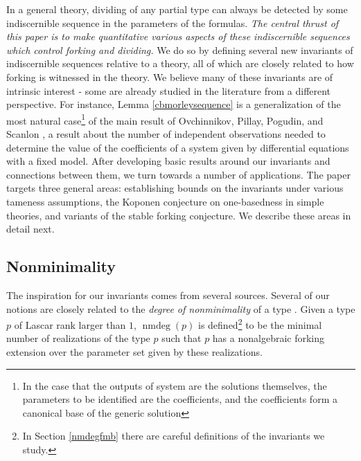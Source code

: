 \documentclass[11pt]{amsart}
\def\nmdeg{\mathop{\rm nmdeg}}
\def\nmdeg{\operatorname{nmdeg}}
\theoremstyle{definition}
\theoremstyle{remark}
\numberwithin{equation}{section}
\begin{document}
In a general theory, dividing of any partial type can always be detected by some indiscernible sequence in the parameters of the formulas. \emph{The central thrust of this paper is to make quantitative various aspects of these indiscernible sequences which control forking and dividing.} We do so by defining several new invariants of indiscernible sequences relative to a theory, all of which are closely related to how forking is witnessed in the theory. We believe many of these invariants are of intrinsic interest - some are already studied in the literature from a different perspective. For instance, Lemma \ref{cbmorleysequence} is a generalization of the most natural case\footnote{In the case that the outputs of system are the solutions themselves, the parameters to be identified are the coefficients, and the coefficients form a canonical base of the generic solution} of the main result of Ovchinnikov, Pillay, Pogudin, and Scanlon \cite[Theorem 3.1]{ovchinnikov2022multi},  a result about the number of independent observations needed to determine the value of the coefficients of a system given by differential equations with a fixed model. After developing basic results around our invariants and connections between them, we turn towards a number of applications. The paper targets three general areas: establishing bounds on the invariants under various tameness assumptions, the Koponen conjecture on one-basedness in simple theories, and variants of the stable forking conjecture. We describe these areas in detail next. 

\subsection{Nonminimality}

The inspiration for our invariants comes from several sources. Several of our notions are closely related to the \emph{degree of nonminimality} of a type \cite{freitag2023degree}. Given a type $p$ of Lascar rank larger than $1$, $\nmdeg {(p)}$ is defined\footnote{In Section \ref{nmdegfmb} there are careful definitions of the invariants we study.} to be the minimal number of realizations of the type $p$ such that $p$ has a nonalgebraic forking extension over the parameter set given by these realizations.
\end{document}
